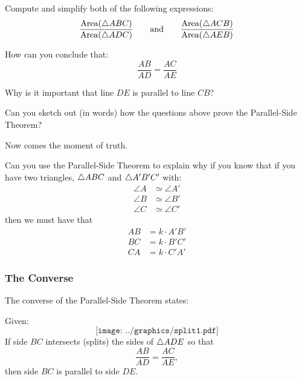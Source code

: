 \begin{question} Compute and simplify both of the following expressions:
\[
\frac{\mathrm{Area}(\triangle ABC)}{\mathrm{Area}(\triangle ADC)} \qquad\text{and}\qquad\frac{ \mathrm{Area}(\triangle ACB)}{\mathrm{Area}(\triangle AEB)}
\]
\end{question}
\QM


\begin{question} How can you conclude that: 
\[
\frac{AB}{AD} = \frac{AC}{AE}
\]
\end{question}
\QM

\begin{question} 
Why is it important that line $DE$ is parallel to line $CB$?
\end{question}
\QM


\begin{question} 
Can you sketch out (in words) how the questions above prove the Parallel-Side
Theorem?
\end{question}
\QM

Now comes the moment of truth. 
\begin{question}
Can you use the Parallel-Side Theorem to explain why if you know that
if you have two triangles, $\triangle ABC$ and $\triangle A'B'C'$ with:
\begin{align*}
\angle A &\simeq \angle A'\\
\angle B &\simeq \angle B' \\
\angle C &\simeq \angle C'
\end{align*}
then we must have that
\begin{align*}
AB &= k\cdot A'B'\\
BC &= k\cdot B'C'\\
CA &= k\cdot C'A'
\end{align*}
\end{question}
\QM


\subsubsection{The Converse}

The converse of the Parallel-Side Theorem states:

\begin{theorem} 
Given:
\[
\texttt{[image: ../graphics/split1.pdf]}
\]
If side $BC$ intersects (splits) the sides of $\triangle ADE$ so that
\[
\frac{AB}{AD} = \frac{AC}{AE},
\] 
then side $BC$ is parallel to side $DE$.
\end{theorem}

